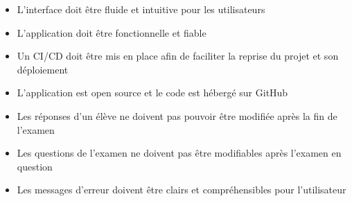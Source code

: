 \begin{itemize}
    \item L'interface doit être fluide et intuitive pour les utilisateurs
    \item L'application doit être fonctionnelle et fiable
    \item Un CI/CD doit être mis en place afin de faciliter la reprise du projet et son déploiement
    \item L'application est open source et le code est hébergé sur GitHub
    \item Les réponses d'un élève ne doivent pas pouvoir être modifiée après la fin de l'examen
    \item Les questions de l'examen ne doivent pas être modifiables après l'examen en question
    \item Les messages d'erreur doivent être clairs et compréhensibles pour l'utilisateur
\end{itemize}
